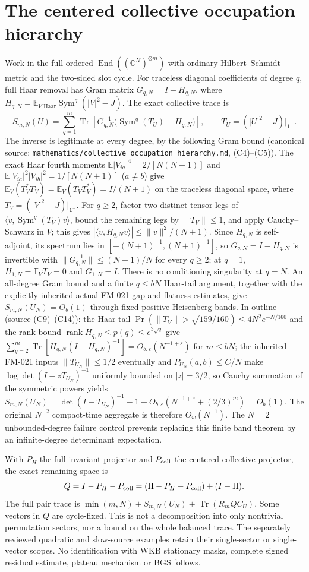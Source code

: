 \section{The centered collective occupation hierarchy}
Work in the full ordered $\operatorname{End}((\mathbb C^N)^{\otimes m})$
with ordinary Hilbert--Schmidt metric and the two-sided slot cycle.
For traceless diagonal coefficients of degree $q$, full Haar removal has
Gram matrix $G_{q,N}=I-H_{q,N}$, where
$H_{q,N}=\mathbb E_{V\text{ Haar}}\operatorname{Sym}^q(|V|^2-J)$.
The exact collective trace is
\[
 S_{m,N}(U)=\sum_{q=1}^m
 \operatorname{Tr}\!\left[G_{q,N}^{-1}
 \bigl(\operatorname{Sym}^q(T_U)-H_{q,N}\bigr)\right],
 \qquad T_U=(|U|^2-J)|_{\mathbf1^\perp}.
\]
The inverse is legitimate at every degree, by the following Gram bound
(canonical source: \texttt{mathematics/collective\_occupation\_hierarchy.md},
(C4)--(C5)). The exact Haar fourth moments
$\mathbb E|V_{ia}|^4=2/[N(N+1)]$ and
$\mathbb E|V_{ia}|^2|V_{ib}|^2=1/[N(N+1)]$ ($a\ne b$) give
$\mathbb E_V(T_V^*T_V)=\mathbb E_V(T_VT_V^*)=I/(N+1)$ on the traceless
diagonal space, where $T_V=(|V|^2-J)|_{\mathbf1^\perp}$.
For $q\ge2$, factor two distinct tensor legs of
$\langle v,\operatorname{Sym}^q(T_V)v\rangle$, bound the remaining legs
by $\|T_V\|\le1$, and apply Cauchy--Schwarz in $V$; this gives
$|\langle v,H_{q,N}v\rangle|\le\|v\|^2/(N+1)$. Since $H_{q,N}$ is
self-adjoint, its spectrum lies in $[-(N+1)^{-1},(N+1)^{-1}]$, so
$G_{q,N}=I-H_{q,N}$ is invertible with
$\|G_{q,N}^{-1}\|\le(N+1)/N$ for every $q\ge2$; at $q=1$,
$H_{1,N}=\mathbb E_VT_V=0$ and $G_{1,N}=I$. There is no conditioning
singularity at $q=N$.
An all-degree Gram bound and a finite $q\le bN$ Haar-tail argument,
together with the explicitly inherited actual FM-021 gap and flatness
estimates, give $S_{m,N}(U_N)=O_b(1)$ through fixed positive Heisenberg bands.
In outline (source (C9)--(C14)): the Haar tail
$\Pr(\|T_V\|>\sqrt{159/160})\le4N^2e^{-N/160}$ and the rank bound
$\operatorname{rank}H_{q,N}\le p(q)\le e^{3\sqrt q}$ give
$\sum_{q=2}^m\operatorname{Tr}[H_{q,N}(I-H_{q,N})^{-1}]
=O_{b,\varepsilon}(N^{-1+\varepsilon})$ for $m\le bN$; the inherited
FM-021 inputs $\|T_{U_N}\|\le1/2$ eventually and $P_{U_N}(a,b)\le C/N$ make
$\log\det(I-zT_{U_N})^{-1}$ uniformly bounded on $|z|=3/2$, so Cauchy
summation of the symmetric powers yields
$S_{m,N}(U_N)=\det(I-T_{U_N})^{-1}-1
+O_{b,\varepsilon}(N^{-1+\varepsilon}+(2/3)^m)=O_b(1)$.
The original $N^{-2}$ compact-time aggregate is therefore $O_w(N^{-1})$.
The $N=2$ unbounded-degree failure control prevents replacing this finite
band theorem by an infinite-degree determinant expectation.

With $P_H$ the full invariant projector and $P_{\rm coll}$ the centered
collective projector, the exact remaining space is
\[
 Q=I-P_H-P_{\rm coll}
   =(\Pi-P_H-P_{\rm coll})+(I-\Pi).
\]
The full pair trace is $\min(m,N)+S_{m,N}(U_N)+\operatorname{Tr}(R_mQC_U)$.
Some vectors in $Q$ are cycle-fixed. This is not a decomposition into only
nontrivial permutation sectors, nor a bound on the whole balanced trace.
The separately reviewed quadratic and slow-source examples retain their
single-sector or single-vector scopes. No identification with WKB stationary
masks, complete signed residual estimate, plateau mechanism or BGS follows.
